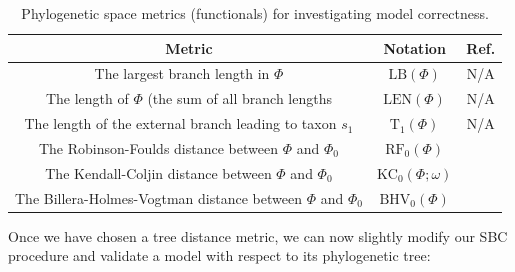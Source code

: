 \documentclass[oneside]{article}
\begin{document}
\begin{table}[h]
  \caption{Phylogenetic space metrics (functionals) for investigating model correctness.}
  \label{suptab:dists}
  \centering
  \begin{tabular}{ c|c|c }
    \hline
    Metric & Notation & Ref. \\
    \hline  
    The largest branch length in $\Phi$ & $\text{LB}(\Phi)$ & N/A\\
    The length of $\Phi$ (the sum of all branch lengths & $\text{LEN}(\Phi)$ & N/A\\
    The length of the external branch leading to taxon $s_1$ & $\text{T}_1(\Phi)$ & N/A\\
    The Robinson-Foulds distance between $\Phi$ and $\Phi_0$ & $\text{RF}_0(\Phi)$ & \citep{Robinson1981}\\
    The Kendall-Coljin distance between $\Phi$ and $\Phi_0$ & $\text{KC}_0(\Phi;\omega)$ & \citep{Kendall2016}\\
    The Billera-Holmes-Vogtman distance between $\Phi$ and $\Phi_0$ & $\text{BHV}_0(\Phi)$ & \citep{Billera2001}\\
    \hline
  \end{tabular}
\end{table}


Once we have chosen a tree distance metric, we can now slightly modify
our SBC procedure and validate a model with respect to its
phylogenetic tree:
   
\end{document}
